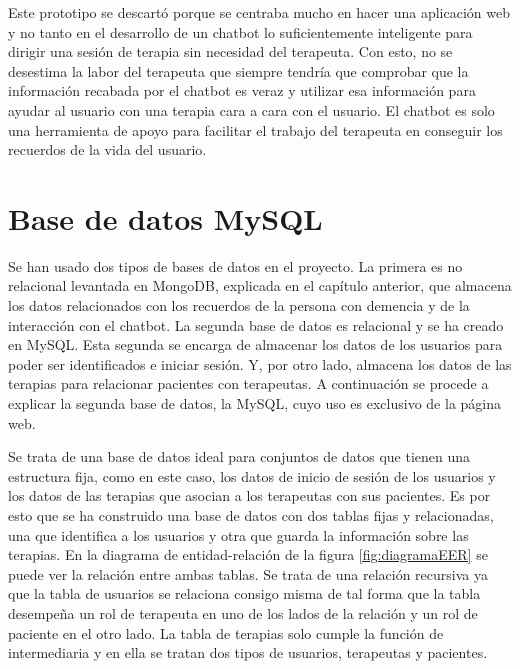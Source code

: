 Este prototipo se descartó porque se centraba mucho en hacer una aplicación web y no tanto en el desarrollo de un chatbot lo suficientemente inteligente para dirigir una sesión de terapia sin necesidad del terapeuta. Con esto, no se desestima la labor del terapeuta que siempre tendría que comprobar que la información recabada por el chatbot es veraz y utilizar esa información para ayudar al usuario con una terapia cara a cara con el usuario. El chatbot es solo una herramienta de apoyo para facilitar el trabajo del terapeuta en conseguir los recuerdos de la vida del usuario. 



\section{Base de datos MySQL}

Se han usado dos tipos de bases de datos en el proyecto. La primera es no relacional levantada en MongoDB, explicada en el capítulo anterior, que almacena los datos relacionados con los recuerdos de la persona con demencia y de la interacción con el chatbot. La segunda base de datos es relacional y se ha creado en MySQL. Esta segunda se encarga de almacenar los datos de los usuarios para poder ser identificados e iniciar sesión. Y, por otro lado, almacena los datos de las terapias para relacionar pacientes con terapeutas. A continuación se procede a explicar la segunda base de datos, la MySQL, cuyo uso es exclusivo de la página web. 

Se trata de una base de datos ideal para conjuntos de datos que tienen una estructura fija, como en este caso, los datos de inicio de sesión de los usuarios y los datos de las terapias que asocian a los terapeutas con sus pacientes. Es por esto que se ha construido una base de datos con dos tablas fijas y relacionadas, una que identifica a los usuarios y otra que guarda la información sobre las terapias. En la diagrama de entidad-relación de la figura \ref{fig:diagramaEER} se puede ver la relación entre ambas tablas. Se trata de una relación recursiva ya que la tabla de usuarios se relaciona consigo misma de tal forma que la tabla desempeña un rol de terapeuta en uno de los lados de la relación y un rol de paciente en el otro lado. La tabla de terapias solo cumple la función de intermediaria y en ella se tratan dos tipos de usuarios, terapeutas y pacientes.

